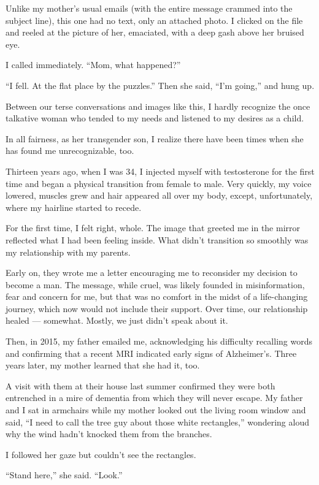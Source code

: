 Unlike my mother's usual emails (with the entire message crammed into
the subject line), this one had no text, only an attached photo. I
clicked on the file and reeled at the picture of her, emaciated, with a
deep gash above her bruised eye.

I called immediately. ``Mom, what happened?''

``I fell. At the flat place by the puzzles.'' Then she said, ``I'm
going,'' and hung up.

Between our terse conversations and images like this, I hardly recognize
the once talkative woman who tended to my needs and listened to my
desires as a child.

In all fairness, as her transgender son, I realize there have been times
when she has found me unrecognizable, too.

Thirteen years ago, when I was 34, I injected myself with testosterone
for the first time and began a physical transition from female to male.
Very quickly, my voice lowered, muscles grew and hair appeared all over
my body, except, unfortunately, where my hairline started to recede.

For the first time, I felt right, whole. The image that greeted me in
the mirror reflected what I had been feeling inside. What didn't
transition so smoothly was my relationship with my parents.

Early on, they wrote me a letter encouraging me to reconsider my
decision to become a man. The message, while cruel, was likely founded
in misinformation, fear and concern for me, but that was no comfort in
the midst of a life-changing journey, which now would not include their
support. Over time, our relationship healed --- somewhat. Mostly, we
just didn't speak about it.

Then, in 2015, my father emailed me, acknowledging his difficulty
recalling words and confirming that a recent MRI indicated early signs
of Alzheimer's. Three years later, my mother learned that she had it,
too.

A visit with them at their house last summer confirmed they were both
entrenched in a mire of dementia from which they will never escape. My
father and I sat in armchairs while my mother looked out the living room
window and said, ``I need to call the tree guy about those white
rectangles,'' wondering aloud why the wind hadn't knocked them from the
branches.

I followed her gaze but couldn't see the rectangles.

``Stand here,'' she said. ``Look.''

